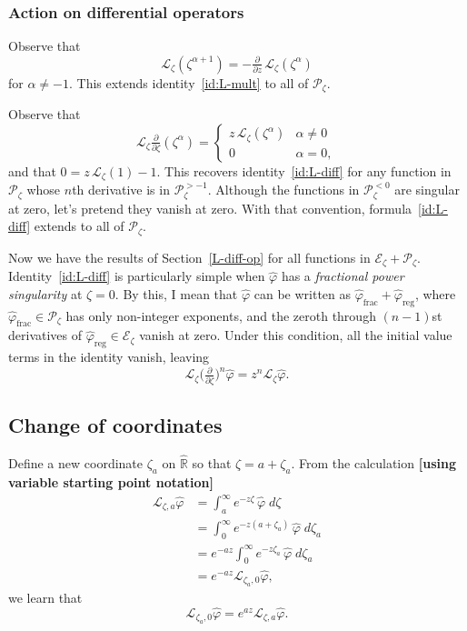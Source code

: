 \documentclass{article}
\theoremstyle{plain}
\newcommand{\R}{\mathbb{R}}
\newcommand{\laplace}{\mathcal{L}}
\begin{document}
\subsubsection{Action on differential operators}\label{L-diff-op-alg}
Observe that
\[ \laplace_\zeta(\zeta^{\alpha + 1}) = -\tfrac{\partial}{\partial z}\,\laplace_\zeta(\zeta^\alpha) \]
for $\alpha \neq -1$. This extends identity~\ref{id:L-mult} to all of $\mathcal{P}_\zeta$.

Observe that
\[ \laplace_\zeta\tfrac{\partial}{\partial \zeta}(\zeta^\alpha) = \begin{cases}
z\,\laplace_\zeta(\zeta^\alpha) & \alpha \neq 0 \\
0 & \alpha = 0,
\end{cases} \]
and that $0 = z\,\laplace_\zeta(1) - 1$. This recovers identity~\ref{id:L-diff} for any function in $\mathcal{P}_\zeta$ whose $n$th derivative is in $\mathcal{P}_\zeta^{> -1}$. Although the functions in $\mathcal{P}_\zeta^{< 0}$ are singular at zero, let's pretend they vanish at zero. With that convention, formula~\ref{id:L-diff} extends to all of $\mathcal{P}_\zeta$.

Now we have the results of Section~\ref{L-diff-op} for all functions in $\mathcal{E}_\zeta + \mathcal{P}_\zeta$. Identity~\ref{id:L-diff} is particularly simple when $\hat{\varphi}$ has a {\em fractional power singularity} at $\zeta = 0$. By this, I mean that $\hat{\varphi}$ can be written as $\hat{\varphi}_\text{frac} + \hat{\varphi}_\text{reg}$, where $\hat{\varphi}_\text{frac} \in \mathcal{P}_\zeta$ has only non-integer exponents, and the zeroth through $(n-1)$st derivatives of $\hat{\varphi}_\text{reg} \in \mathcal{E}_\zeta$ vanish at zero. Under this condition, all the initial value terms in the identity vanish, leaving
\[ \laplace_\zeta \big(\tfrac{\partial}{\partial \zeta}\big)^n \hat{\varphi} = z^n \laplace_\zeta \hat{\varphi}. \]
\color{black}
\subsection{Change of coordinates}\label{translation}
Define a new coordinate $\zeta_a$ on $\hat{\R}$ so that $\zeta = a + \zeta_a$. From the calculation \textbf{[using variable starting point notation]}
\begin{align*}
\laplace_{\zeta, a} \hat{\varphi} & = \int_a^\infty e^{-z \zeta}\,\hat{\varphi}\;d\zeta \\
& = \int_0^\infty e^{-z(a + \zeta_a)}\,\hat{\varphi}\;d\zeta_a \\
& = e^{-az} \int_0^\infty e^{-z\zeta_a}\,\hat{\varphi}\;d\zeta_a \\
& = e^{-az} \laplace_{\zeta_a, 0} \hat{\varphi},
\end{align*}
we learn that
\[ \laplace_{\zeta_a, 0} \hat{\varphi} = e^{az} \laplace_{\zeta, a} \hat{\varphi}. \]
\end{document}
